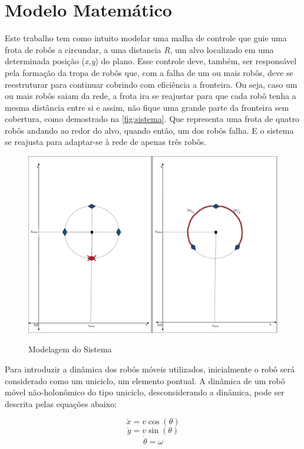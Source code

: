 \section{Modelo Matemático}
\label{sec:modMatematico}
Este trabalho tem como intuito modelar uma malha de controle que guie uma frota de robôs a circundar, a uma distancia \emph{R}, um alvo localizado em uma determinada posição (\emph{x,y}) do plano. Esse controle deve, também, ser responsável pela formação da tropa de robôs que, com a falha de um ou mais robôs, deve se reestruturar para continuar cobrindo com eficiência a fronteira. Ou seja, caso um ou mais robôs saiam da rede, a frota ira se reajustar para que cada robô tenha a mesma distância entre si e assim, não fique uma grande parte da fronteira sem cobertura, como demostrado na \autoref{fig:sistema}. Que representa uma frota de quatro robôs andando ao redor do alvo, quando então, um dos robôs falha. E o sistema se reajusta para adaptar-se à rede de apenas três robôs.

\begin{figure}[!htb]
	\centering
	\caption{Modelagem do Sistema}
	\includegraphics[width=1.0\textwidth]{./04-figuras/sistema}
	\label{fig:sistema}
\end{figure}

Para introduzir a dinâmica dos robôs móveis utilizados, inicialmente o robô será considerado como um uniciclo, um elemento pontual. A dinâmica de um robô móvel não-holonômico do tipo uniciclo, desconsiderando a dinâmica, pode ser descrita pelas equações abaixo:

\begin{equation}
\dot{x} = v\cos(\theta) 
\label{eq:posiçãox}
\end{equation}
\begin{equation}
\dot{y} = v\sin(\theta)
\label{eq:posiçãoy}
\end{equation}
\begin{equation}
\dot{\theta} = \omega
\label{eq:posiçãotheta}
\end{equation}

